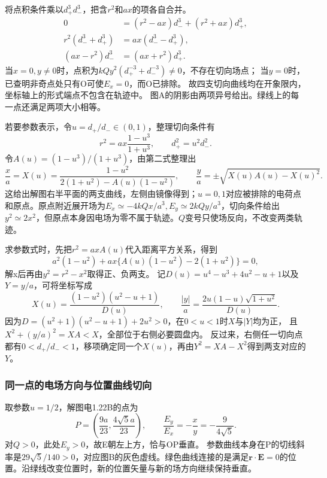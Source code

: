 \documentclass[UTF8,fontset=fandol,a4paper,11pt]{ctexart}
\begin{document}
将点积条件乘以$d_+^3d_-^3$，把含$r^2$和$ax$的项各自合并。
\[
\begin{aligned}
0&=(r^2-ax)d_-^3+(r^2+ax)d_+^3,\\
r^2(d_-^3+d_+^3)&=ax(d_-^3-d_+^3),\\
(ax-r^2)d_-^3&=(ax+r^2)d_+^3.
\end{aligned}
\]
当$x=0,y\ne0$时，点积为$kQy^2(d_+^{-3}+d_-^{-3})\ne0$，不存在切向场点；
当$y=0$时，已查明非奇点处只有O可使$E_x=0$，而O已排除。
故四支切向曲线均在开象限内，坐标轴上的形式端点不包含在轨迹中。
图A的阴影由两项异号给出。绿线上的每一点还满足两项大小相等。

若要参数表示，令$u=d_+/d_-\in(0,1)$，整理切向条件有
\[r^2=ax\frac{1-u^3}{1+u^3},\qquad
d_+^2=u^2d_-^2.
\]
令$A(u)=(1-u^3)/(1+u^3)$，由第二式整理出
\[\frac xa=X(u)=\frac{1-u^2}{2(1+u^2)-A(u)(1-u^2)},\qquad
\frac ya=\pm\sqrt{X(u)A(u)-X(u)^2}.
\]
这给出解图右半平面的两支曲线，左侧由镜像得到；$u=0,1$对应被排除的电荷点和原点。原点附近展开场为$E_x\simeq-4kQx/a^3,E_y\simeq2kQy/a^3$，切向条件给出$y^2\simeq2x^2$，但原点本身因电场为零不属于轨迹。$Q$变号只使场反向，不改变两类轨迹。

求参数式时，先把$r^2=axA(u)$代入距离平方关系，得到
\[
a^2(1-u^2)+ax\{A(u)(1-u^2)-2(1+u^2)\}=0,
\]
解x后再由$y^2=r^2-x^2$取得正、负两支。
记$D(u)=u^4-u^3+4u^2-u+1$以及$Y=y/a$，可将坐标写成
\[
X(u)=\frac{(1-u^2)(u^2-u+1)}{D(u)},\qquad
\frac{|y|}a=\frac{2u(1-u)\sqrt{1+u^2}}{D(u)}.
\]
因为$D=(u^2+1)(u^2-u+1)+2u^2>0$，在$0<u<1$时$X$与$|Y|$均为正，
且$X^2+(y/a)^2=XA<X$，全部位于右侧必要圆盘内。
反过来，右侧任一切向点都有$0<d_+/d_-<1$，移项确定同一个$X(u)$，再由$Y^2=X A-X^2$得到两支对应的$Y$。

\subsubsection*{同一点的电场方向与位置曲线切向}
取参数$u=1/2$，解图电1.22B的点为
\[
P=\left(\frac{9a}{23},\frac{4\sqrt5a}{23}\right),\qquad
\frac{E_y}{E_x}=-\frac{x}{y}=-\frac9{4\sqrt5}.
\]
对$Q>0$，此处$E_y>0$，故E朝左上方，恰与OP垂直。
参数曲线本身在P的切线斜率是$29\sqrt5/140>0$，对应图B的灰色虚线。绿色曲线连接的是满足$\boldsymbol r\cdot\boldsymbol E=0$的位置。沿绿线改变位置时，新的位置矢量与新的场方向继续保持垂直。
\end{document}
